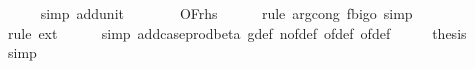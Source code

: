 \begin{isabellebody}
\ \ \ \ \isamarkupfalse%
\ {\isacharparenleft}{\kern0pt}simp\ add{\isacharcolon}{\kern0pt}unit{\isacharunderscore}{\kern0pt}{}{\isacharparenright}{\kern0pt}\isanewline
\ \ \isamarkupfalse%
\ \isamarkupfalse%
\ {\isachardoublequoteopen}{\isachardot}{\kern0pt}{\isachardot}{\kern0pt}{\isachardot}{\kern0pt}\ {\isacharequal}{\kern0pt}\ O{\isacharbrackleft}{\kern0pt}{\isacharquery}{\kern0pt}F{\isacharbrackright}{\kern0pt}{\isacharparenleft}{\kern0pt}{\isacharquery}{\kern0pt}rhs{\isacharparenright}{\kern0pt}{\isachardoublequoteclose}\isanewline
\ \ \ \ \isamarkupfalse%
\ {\isacharparenleft}{\kern0pt}rule\ arg{\isacharunderscore}{\kern0pt}cong{}{\isacharbrackleft}{\kern0pt}\ f{\isacharequal}{\kern0pt}{\isachardoublequoteopen}bigo{\isachardoublequoteclose}{\isacharbrackright}{\kern0pt}{\isacharcomma}{\kern0pt}\ simp{\isacharparenright}{\kern0pt}\isanewline
\ \ \ \ \isamarkupfalse%
\ {\isacharparenleft}{\kern0pt}rule\ ext{\isacharparenright}{\kern0pt}\isanewline
\ \ \ \ \isamarkupfalse%
\ {\isacharparenleft}{\kern0pt}simp\ add{\isacharcolon}{\kern0pt}case{\isacharunderscore}{\kern0pt}prod{\isacharunderscore}{\kern0pt}beta{\isacharprime}{\kern0pt}\ g{\isacharunderscore}{\kern0pt}def\ n{\isacharunderscore}{\kern0pt}of{\isacharunderscore}{\kern0pt}def\ {\isasymepsilon}{\isacharunderscore}{\kern0pt}of{\isacharunderscore}{\kern0pt}def\ {\isasymdelta}{\isacharunderscore}{\kern0pt}of{\isacharunderscore}{\kern0pt}def{\isacharparenright}{\kern0pt}\isanewline
\ \ \isamarkupfalse%
\ \isamarkupfalse%
\ {\isacharquery}{\kern0pt}thesis\isanewline
\ \ \ \ \isamarkupfalse%
\ simp\isanewline
{}\isamarkupfalse%
%
\endisatagproof
{\isafoldproof}%
%
\isadelimproof
\isanewline
%
\endisadelimproof
%
\isadelimtheory
\isanewline
%
\endisadelimtheory
%
\isatagtheory
{}\isamarkupfalse%
%
\endisatagtheory
{\isafoldtheory}%
%
\isadelimtheory
%
\endisadelimtheory
%
\end{isabellebody}%
\endinput
